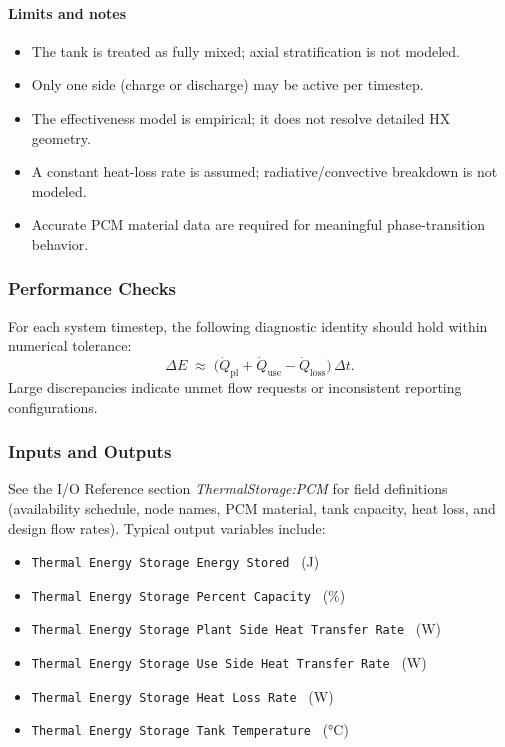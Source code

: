 \paragraph{Limits and notes}\label{pcm-limits}

\begin{itemize}
  \item The tank is treated as fully mixed; axial stratification is not modeled.
  \item Only one side (charge or discharge) may be active per timestep.
  \item The effectiveness model is empirical; it does not resolve detailed HX geometry.
  \item A constant heat-loss rate is assumed; radiative/convective breakdown is not modeled.
  \item Accurate PCM material data are required for meaningful phase-transition behavior.
\end{itemize}

\subsubsection{Performance Checks}\label{pcm-performance-checks}

For each system timestep, the following diagnostic identity should hold within numerical tolerance:
\begin{equation}
\Delta E \;\approx\; \bigl(\dot Q_{\mathrm{pl}} + \dot Q_{\mathrm{use}} - \dot Q_{\mathrm{loss}}\bigr)\,\Delta t.
\end{equation}
Large discrepancies indicate unmet flow requests or inconsistent reporting configurations.

\subsubsection{Inputs and Outputs}\label{pcm-io-refs}

See the I/O Reference section \emph{ThermalStorage:PCM} for field definitions (availability schedule, node names, PCM material, tank capacity, heat loss, and design flow rates). Typical output variables include:
\begin{itemize}
  \item \texttt{Thermal Energy Storage Energy Stored} \, (J)
  \item \texttt{Thermal Energy Storage Percent Capacity} \, (\%)
  \item \texttt{Thermal Energy Storage Plant Side Heat Transfer Rate} \, (W)
  \item \texttt{Thermal Energy Storage Use Side Heat Transfer Rate} \, (W)
  \item \texttt{Thermal Energy Storage Heat Loss Rate} \, (W)
  \item \texttt{Thermal Energy Storage Tank Temperature} \, (°C)
\end{itemize}
